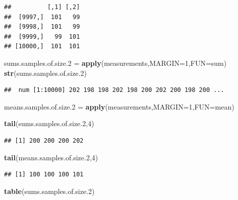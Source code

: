 \documentclass[
]{article}
\newenvironment{Shaded}{\begin{snugshade}}{\end{snugshade}}
\newcommand{\DataTypeTok}[1]{\textcolor[rgb]{0.13,0.29,0.53}{#1}}
\newcommand{\DecValTok}[1]{\textcolor[rgb]{0.00,0.00,0.81}{#1}}
\newcommand{\FloatTok}[1]{\textcolor[rgb]{0.00,0.00,0.81}{#1}}
\newcommand{\KeywordTok}[1]{\textcolor[rgb]{0.13,0.29,0.53}{\textbf{#1}}}
\newcommand{\NormalTok}[1]{#1}
\newcommand{\StringTok}[1]{\textcolor[rgb]{0.31,0.60,0.02}{#1}}
\begin{document}
\begin{verbatim}
##          [,1] [,2]
##  [9997,]  101   99
##  [9998,]  101   99
##  [9999,]   99  101
## [10000,]  101  101
\end{verbatim}

\begin{Shaded}
\begin{Highlighting}[]
\NormalTok{sums.samples.of.size}\FloatTok{.2}\NormalTok{ =}\StringTok{ }\KeywordTok{apply}\NormalTok{(measurements,}\DataTypeTok{MARGIN=}\DecValTok{1}\NormalTok{,}\DataTypeTok{FUN=}\NormalTok{sum)}
\KeywordTok{str}\NormalTok{(sums.samples.of.size}\FloatTok{.2}\NormalTok{)}
\end{Highlighting}
\end{Shaded}

\begin{verbatim}
##  num [1:10000] 202 198 198 202 198 200 202 200 198 200 ...
\end{verbatim}

\begin{Shaded}
\begin{Highlighting}[]
\NormalTok{means.samples.of.size}\FloatTok{.2}\NormalTok{ =}\StringTok{ }\KeywordTok{apply}\NormalTok{(measurements,}\DataTypeTok{MARGIN=}\DecValTok{1}\NormalTok{,}\DataTypeTok{FUN=}\NormalTok{mean)}

\KeywordTok{tail}\NormalTok{(sums.samples.of.size}\FloatTok{.2}\NormalTok{,}\DecValTok{4}\NormalTok{)}
\end{Highlighting}
\end{Shaded}

\begin{verbatim}
## [1] 200 200 200 202
\end{verbatim}

\begin{Shaded}
\begin{Highlighting}[]
\KeywordTok{tail}\NormalTok{(means.samples.of.size}\FloatTok{.2}\NormalTok{,}\DecValTok{4}\NormalTok{)}
\end{Highlighting}
\end{Shaded}

\begin{verbatim}
## [1] 100 100 100 101
\end{verbatim}

\begin{Shaded}
\begin{Highlighting}[]
\KeywordTok{table}\NormalTok{(sums.samples.of.size}\FloatTok{.2}\NormalTok{)}
\end{Highlighting}
\end{Shaded}
\end{document}
